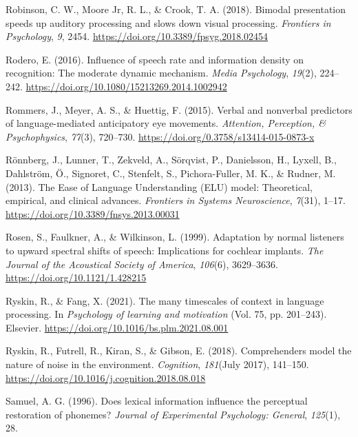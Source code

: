\documentclass[a4paper, nobind]{templates/ociamthesis}
\newlength{\cslhangindent}
\newenvironment{CSLReferences}[2] %
 {%
  \setlength{\parindent}{0pt}
  \ifodd #1
  \let\oldpar\par
  \def\par{\hangindent=\cslhangindent\oldpar}
  \fi
  \setlength{\parskip}{1mm}
  \setlength{\baselineskip}{6mm}
 }%
 {}
\begin{document}
\begin{CSLReferences}{1}{0}
\leavevmode{}%
Robinson, C. W., Moore Jr, R. L., \& Crook, T. A. (2018). Bimodal presentation speeds up auditory processing and slows down visual processing. \emph{Frontiers in Psychology}, \emph{9}, 2454. \url{https://doi.org/10.3389/fpsyg.2018.02454}

\leavevmode{}%
Rodero, E. (2016). {Influence of speech rate and information density on recognition: The moderate dynamic mechanism}. \emph{Media Psychology}, \emph{19}(2), 224--242. \url{https://doi.org/10.1080/15213269.2014.1002942}

\leavevmode{}%
Rommers, J., Meyer, A. S., \& Huettig, F. (2015). Verbal and nonverbal predictors of language-mediated anticipatory eye movements. \emph{Attention, Perception, \& Psychophysics}, \emph{77}(3), 720--730. \url{https://doi.org/0.3758/s13414-015-0873-x}

\leavevmode{}%
Rönnberg, J., Lunner, T., Zekveld, A., Sörqvist, P., Danielsson, H., Lyxell, B., Dahlström, Ö., Signoret, C., Stenfelt, S., Pichora-Fuller, M. K., \& Rudner, M. (2013). {The Ease of Language Understanding (ELU) model: Theoretical, empirical, and clinical advances}. \emph{Frontiers in Systems Neuroscience}, \emph{7}(31), 1--17. \url{https://doi.org/10.3389/fnsys.2013.00031}

\leavevmode{}%
Rosen, S., Faulkner, A., \& Wilkinson, L. (1999). Adaptation by normal listeners to upward spectral shifts of speech: Implications for cochlear implants. \emph{The Journal of the Acoustical Society of America}, \emph{106}(6), 3629--3636. \url{https://doi.org/10.1121/1.428215}

\leavevmode{}%
Ryskin, R., \& Fang, X. (2021). The many timescales of context in language processing. In \emph{Psychology of learning and motivation} (Vol. 75, pp. 201--243). Elsevier. \url{https://doi.org/10.1016/bs.plm.2021.08.001}

\leavevmode{}%
Ryskin, R., Futrell, R., Kiran, S., \& Gibson, E. (2018). {Comprehenders model the nature of noise in the environment}. \emph{Cognition}, \emph{181}(July 2017), 141--150. \url{https://doi.org/10.1016/j.cognition.2018.08.018}

\leavevmode{}%
Samuel, A. G. (1996). Does lexical information influence the perceptual restoration of phonemes? \emph{Journal of Experimental Psychology: General}, \emph{125}(1), 28.


\end{CSLReferences}
\end{document}
